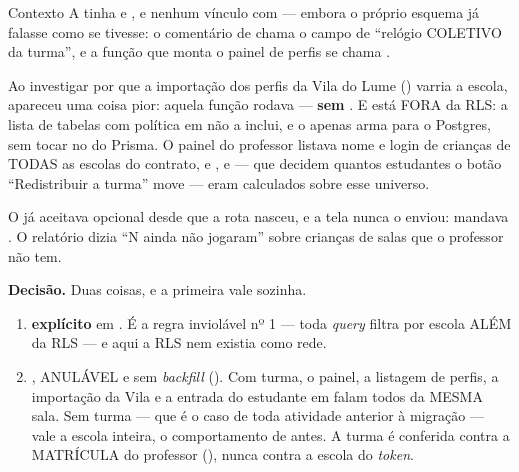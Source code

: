 \begin{especificacao}{Contexto}
A  tinha  e , e nenhum
vínculo com  --- embora o próprio esquema já falasse como se tivesse:
o comentário de  chama o campo de ``relógio COLETIVO da turma'', e a
função que monta o painel de perfis se chama .

Ao investigar por que a importação dos perfis da Vila do Lume
() varria a escola, apareceu uma coisa
pior: aquela função rodava 
--- \textbf{sem }. E  está FORA da RLS: a lista de
tabelas com política em  não a inclui, e o
 apenas arma  para o Postgres, sem tocar no
 do Prisma. O painel do professor listava nome e login de crianças de
TODAS as escolas do contrato, e ,  e
 --- que decidem quantos estudantes o botão
``Redistribuir a turma'' move --- eram calculados sobre esse universo.

O  já aceitava  opcional desde que a rota nasceu, e
a tela nunca o enviou: mandava \cd{\{\}}. O relatório dizia ``N ainda não
jogaram'' sobre crianças de salas que o professor não tem.
\end{especificacao}

\textbf{Decisão.} Duas coisas, e a primeira vale sozinha.

\begin{enumerate}
  \item \textbf{ explícito} em . É a
    regra inviolável nº 1 --- toda \emph{query} filtra por escola ALÉM da RLS ---
    e aqui a RLS nem existia como rede.
  \item \textbf{}, ANULÁVEL e sem
    \emph{backfill} (). Com turma, o
    painel, a listagem de perfis, a importação da Vila e a entrada do estudante em
     falam todos da MESMA sala. Sem turma --- que é o caso de toda
    atividade anterior à migração --- vale a escola inteira, o comportamento de
    antes. A turma é conferida contra a MATRÍCULA do professor
    (), nunca contra a escola do \emph{token}.
\end{enumerate}

